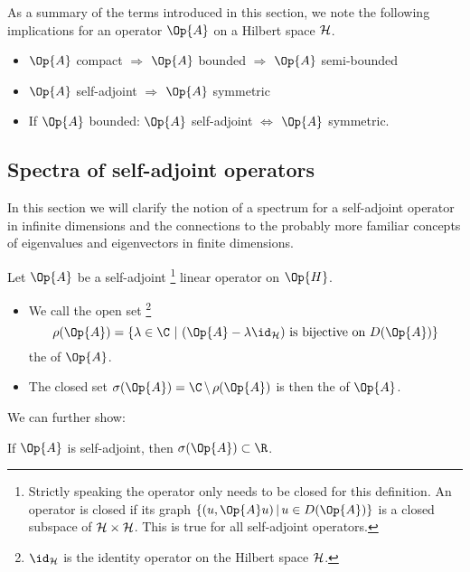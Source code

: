 \begin{rem}
	As a summary of the terms introduced in this section,
	we note the following implications for an operator $\Op{A}$
	on a Hilbert space $\mathcal{H}$.
	\begin{itemize}
		\item $\Op{A}$ compact
			$\Rightarrow$ $\Op{A}$ bounded $\Rightarrow$ $\Op{A}$ semi-bounded
		\item $\Op{A}$ self-adjoint $\Rightarrow$ $\Op{A}$ symmetric
		\item If $\Op{A}$ bounded: $\Op{A}$ self-adjoint $\Leftrightarrow$
			$\Op{A}$ symmetric.
	\end{itemize}
\end{rem}

\subsection{Spectra of self-adjoint operators}
In this section we will clarify the notion of a spectrum
for a self-adjoint operator in infinite dimensions
and the connections to the probably more familiar concepts
of eigenvalues and eigenvectors in finite dimensions.

\newcommand{\shiftop}{(\Op{A} - \lambda \id_{\hilbert})}
\begin{defn}
	\label{defn:Spectrum}
	Let $\Op{A}$ be a self-adjoint%
	\footnote{Strictly speaking the operator only needs to be closed for this definition.
	An operator is closed if its graph $\{ (u, \Op{A}u) \, | \, u \in D(\Op{A}) \}$
	is a closed subspace of $\mathcal{H} \times \mathcal{H}$.
	This is true for all self-adjoint operators.}
	linear operator on $\Op{H}$.
	\begin{itemize}
		\item We call the open set%
			\footnote{$\id_{\hilbert}$ is the identity operator on the Hilbert space $\mathcal{H}$.}
			\[ \rho(\Op{A}) = \left\{ \lambda \in \C \ \middle| \
				\shiftop \
				\text{is bijective on $D(\Op{A})$} \right\} \]
			the  of $\Op{A}$.
		\item The closed set $\sigma(\Op{A}) = \C \, \backslash \, \rho(\Op{A})$
			is then the \newterm{spectrum} of $\Op{A}$.
	\end{itemize}
\end{defn}

\noindent
We can further show:~\cite[p.~102]{Helffer2013}
\begin{prop}
	If $\Op{A}$ is self-adjoint, then $\sigma(\Op{A}) \subset \R$.
\end{prop}

